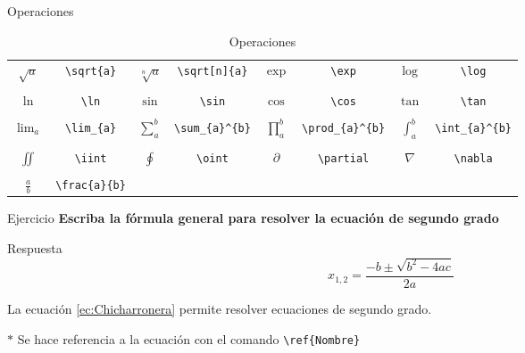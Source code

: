 \documentclass[aspectratio=169, 10pt]{beamer}
\begin{document}
\begin{frame}[fragile]{Operaciones}
    \begin{table}
        \centering
        \begin{tabular}{c c | c c | c c | c c}
             $\sqrt{a}$ & \verb|\sqrt{a}| & $\sqrt[n]{a}$ & \verb|\sqrt[n]{a}| & $\exp$ & \verb|\exp| & $\log$ & \verb|\log| \\ &&&&&&&\\%
             $\ln$ & \verb|\ln| & $\sin$ & \verb|\sin| & $\cos$ & \verb|\cos| & $\tan$ & \verb|\tan| \\ &&&&&&& \\ %
             $\lim_{a}$ & \verb|\lim_{a}| & $\sum_{a}^{b}$ & \verb|\sum_{a}^{b}| & $\prod_{a}^{b}$ & \verb|\prod_{a}^{b}| & $\int_{a}^{b}$ & \verb|\int_{a}^{b}| \\ &&&&&&& \\ %
             $\iint$ & \verb|\iint| & $\oint$ & \verb|\oint| & $\partial$ & \verb|\partial| & $\nabla$ & \verb|\nabla| \\ &&&&&&& \\
             $\frac{a}{b}$ & \verb|\frac{a}{b}| & & & & & & \\
        \end{tabular}
        \caption{Operaciones}
        \label{tab:my_label}
    \end{table}
\end{frame}

\begin{frame}[fragile]{Ejercicio}
    \textbf{Escriba la fórmula general para resolver la ecuación de segundo grado}
    \begin{exampleblock}{Respuesta}
        \begin{equation}
                x_{1,2}=\frac{ -b\pm \sqrt{b^{2}-4ac}}{2a}
                \label{ec:Chicharronera}
        \end{equation}
    \end{exampleblock}
    La ecuación \ref{ec:Chicharronera} permite resolver ecuaciones de segundo grado.

    \vspace{5mm}
    $\ast$ Se hace referencia a la ecuación con el comando \verb|\ref{Nombre}|
    
\end{frame}
\end{document}
